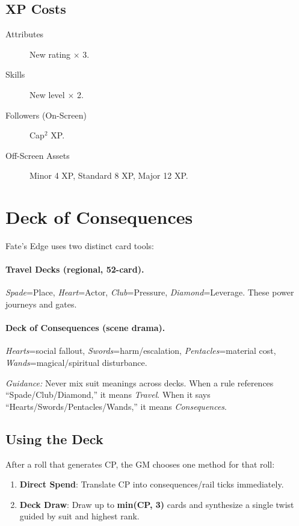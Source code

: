 \subsection{XP Costs}

\begin{description}
\item[Attributes] New rating $\times$ 3.
\item[Skills] New level $\times$ 2.
\item[Followers (On-Screen)] Cap$^2$ XP.
\item[Off-Screen Assets] Minor 4 XP, Standard 8 XP, Major 12 XP.
\end{description}

\section{Deck of Consequences}

Fate's Edge uses two distinct card tools:

\paragraph{Travel Decks (regional, 52-card).}
\emph{Spade}=Place, \emph{Heart}=Actor, \emph{Club}=Pressure, \emph{Diamond}=Leverage. These power journeys and gates.

\paragraph{Deck of Consequences (scene drama).}
\emph{Hearts}=social fallout, \emph{Swords}=harm/escalation, \emph{Pentacles}=material cost, \emph{Wands}=magical/spiritual disturbance.

\textit{Guidance:} Never mix suit meanings across decks. When a rule references ``Spade/Club/Diamond,'' it means \emph{Travel}. When it says ``Hearts/Swords/Pentacles/Wands,'' it means \emph{Consequences}.

\subsection{Using the Deck}

After a roll that generates CP, the GM chooses one method for that roll:
\begin{enumerate}
  \item \textbf{Direct Spend}: Translate CP into consequences/rail ticks immediately.
  \item \textbf{Deck Draw}: Draw up to \textbf{min(CP, 3)} cards and synthesize a single twist guided by suit and highest rank.
\end{enumerate}

